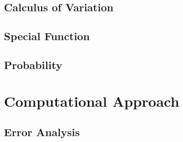 \documentclass[10pt]{report}
\begin{document}
\section{Calculus of Variation}

\clearpage

\clearpage

\section{Special Function}

\clearpage

\section{Probability}

\clearpage

\chapter{Computational Approach}
\clearpage
\section{Error Analysis}


\printbibliography
\end{document}
